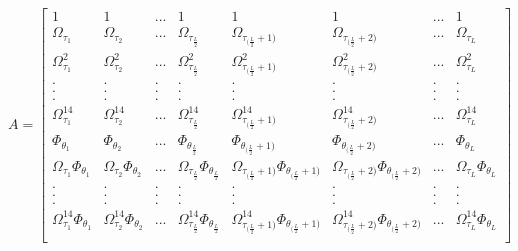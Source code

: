 $
A
=
\begin{bmatrix}
1 & 1 & ... & 1 & 1 & 1 & ... & 1 \\
\Omega_{\tau_{1}} & \Omega_{\tau_{2}} & ... & \Omega_{\tau_{\frac{L}{2}}} & \Omega_{\tau_{(\frac{L}{2}} + 1)} & \Omega_{\tau_{(\frac{L}{2}} + 2)} & ... & \Omega_{\tau_{L}} \\
\Omega^{2}_{\tau_{1}} & \Omega^{2}_{\tau_{2}} & ... & \Omega^{2}_{\tau_{\frac{L}{2}}} & \Omega^{2}_{\tau_{(\frac{L}{2}} + 1)} & \Omega^{2}_{\tau_{(\frac{L}{2}} + 2)} & ... & \Omega^{2}_{\tau_{L}} \\
. & . & . & . & . & . & . & . \\
. & . & . & . & . & . & . & . \\
. & . & . & . & . & . & . & . \\
\Omega^{14}_{\tau_{1}} & \Omega^{14}_{\tau_{2}} & ... & \Omega^{14}_{\tau_{\frac{L}{2}}} & \Omega^{14}_{\tau_{(\frac{L}{2}} + 1)} & \Omega^{14}_{\tau_{(\frac{L}{2}} + 2)} & ... & \Omega^{14}_{\tau_{L}} \\
\Phi_{\theta_{1}} & \Phi_{\theta_{2}} & ... & \Phi_{\theta_{\frac{L}{2}}} & \Phi_{\theta_{(\frac{L}{2}} + 1)} & \Phi_{\theta_{(\frac{L}{2}} + 2)} & ... & \Phi_{\theta_{L}} \\
\Omega_{\tau_{1}} \Phi_{\theta_{1}} & \Omega_{\tau_{2}} \Phi_{\theta_{2}} & ... & \Omega_{\tau_{\frac{L}{2}}} \Phi_{\theta_{\frac{L}{2}}} & \Omega_{\tau_{(\frac{L}{2}} + 1)} \Phi_{\theta_{(\frac{L}{2}} + 1)} & \Omega_{\tau_{(\frac{L}{2}} + 2)} \Phi_{\theta_{(\frac{L}{2}} + 2)} & ... & \Omega_{\tau_{L}} \Phi_{\theta_{L}} \\
. & . & . & . & . & . & . & . \\
. & . & . & . & . & . & . & . \\
. & . & . & . & . & . & . & . \\
\Omega^{14}_{\tau_{1}} \Phi_{\theta_{1}} & \Omega^{14}_{\tau_{2}} \Phi_{\theta_{2}} & ... & \Omega^{14}_{\tau_{\frac{L}{2}}} \Phi_{\theta_{\frac{L}{2}}} & \Omega^{14}_{\tau_{(\frac{L}{2}} + 1)} \Phi_{\theta_{(\frac{L}{2}} + 1)} & \Omega^{14}_{\tau_{(\frac{L}{2}} + 2)} \Phi_{\theta_{(\frac{L}{2}} + 2)} & ... & \Omega^{14}_{\tau_{L}} \Phi_{\theta_{L}} \\
\end{bmatrix}$